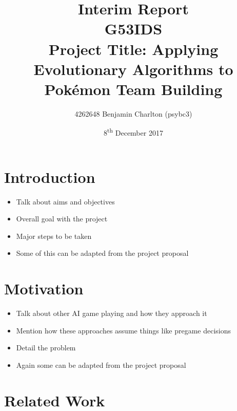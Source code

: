 \documentclass[a4paper]{article}
\newcommand{\Pokemon}{Pok\'{e}mon}
\begin{document}
\title{
    Interim Report
    \\ \large{G53IDS}
    \\ \large{Project Title: Applying Evolutionary Algorithms to \Pokemon{} Team Building}\vspace{-3ex}}
\author{4262648 Benjamin Charlton (psybc3)}
\date{\vspace{-2ex}8\textsuperscript{th} December 2017}
\maketitle

\section{Introduction}
\begin{itemize}
    \item Talk about aims and objectives
    \item Overall goal with the project
    \item Major steps to be taken
    \item Some of this can be adapted from the project proposal
\end{itemize}

\section{Motivation}
\begin{itemize}
    \item Talk about other AI game playing and how they approach it
    \item Mention how these approaches assume things like pregame decisions
    \item Detail the problem
    \item Again some can be adapted from the project proposal
\end{itemize}

\pagebreak{}

\section{Related Work}
\end{document}

